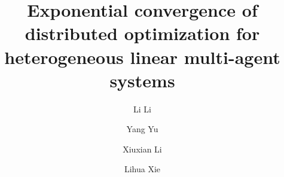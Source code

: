 \documentclass[final,5p,times,twocolumn,authoryear]{elsarticle}
\begin{document}
\begin{frontmatter}



\title{Exponential convergence of distributed optimization for heterogeneous linear multi-agent systems }

\author[1,2]{Li Li}
\author[1]{Yang Yu}
\author[1,3]{Xiuxian Li}
\author[4]{Lihua Xie
	}

\address[1]{Department of Control Science and Engineering, College of Electronics and Information Engineering, Tongji University, Shanghai 201804, China}
\address[2]{Shanghai Institute of Intelligent Science and Technology, Tongji University, Shanghai 201804, China}
\address[3]{Institute for Advanced Study, Tongji University, Shanghai, 200092, China}
\address[4]{School of Electrical and Electronic Engineering, Nanyang Technological University, Singapore 639798}


\end{frontmatter}
\end{document}

